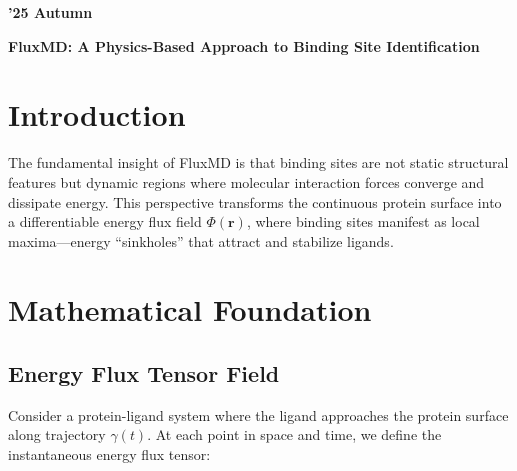 \documentclass{article}
\begin{document}
\noindent
\colorbox{customcolor}{\parbox[t]{\textwidth}{\color{white}\bfseries\fontsize{14pt}{16pt}\selectfont '25 Autumn \textbar {} \hfill}}
\vspace{.5cm}

{\flushleft \Large \bfseries FluxMD: A Physics-Based Approach to Binding Site Identification\par}
\vspace{2em}

\begin{abstract}
We present the rigorous mathematical framework underlying FluxMD, a novel computational method that conceptualizes molecular binding sites as energy flux convergence regions in continuous protein surfaces. Unlike traditional structural approaches that discretize binding sites based on geometric features, FluxMD treats molecular recognition as a continuous field phenomenon where binding sites emerge as singularities in the energy flux landscape. We derive the flux differential equation from first principles, validate its mathematical properties, and demonstrate how it naturally captures both enthalpic and entropic contributions to binding.
\end{abstract}

\section{Introduction}

The fundamental insight of FluxMD is that binding sites are not static structural features but dynamic regions where molecular interaction forces converge and dissipate energy. This perspective transforms the continuous protein surface into a differentiable energy flux field $\Phi(\mathbf{r})$, where binding sites manifest as local maxima—energy ``sinkholes'' that attract and stabilize ligands.

\section{Mathematical Foundation}

\subsection{Energy Flux Tensor Field}

Consider a protein-ligand system where the ligand approaches the protein surface along trajectory $\gamma(t)$. At each point in space and time, we define the instantaneous energy flux tensor:
\end{document}
